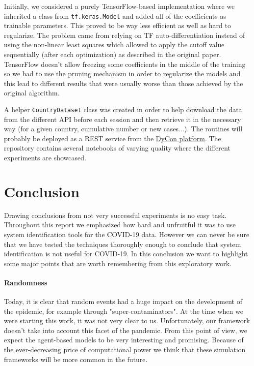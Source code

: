 \documentclass[12pt, letterpaper]{article}
\begin{document}
Initially, we considered a purely TensorFlow-based implementation where we inherited a class from \texttt{tf.keras.Model} and added all of the coefficients as trainable parameters. 
This proved to be way less efficient as well as hard to regularize. 
The problem came from relying on TF auto-differentiation instead of using the non-linear least squares which allowed to apply the cutoff value sequentially (after each optimization) as described in the original paper. 
TensorFlow doesn't allow freezing some coefficients in the middle of the training so we had to use the pruning mechanism in order to regularize the models and this lead to different results that were usually worse than those achieved by the original algorithm.

A helper \texttt{CountryDataset} class was created in order to help download the data from the different API before each session and then retrieve it in the necessary way (for a given country, cumulative number or new cases...). 
The routines will probably be deployed as a REST service from the \href{https://deustotech.github.io/DyCon-Blog/}{DyCon platform}.
The repository contains several notebooks of varying quality where the different experiments are showcased. 


\section{Conclusion}\label{sec:conclusion}

Drawing conclusions from not very successful experiments is no easy task.
Throughout this report we emphasized how hard and unfruitful it was to use system identification tools for the COVID-19 data.
However we can never be sure that we have tested the techniques thoroughly enough to conclude that system identification is not useful for COVID-19.
In this conclusion we want to highlight some major points that are worth remembering from this exploratory work.

\paragraph{Randomness} Today, it is clear that random events had a huge impact on the development of the epidemic, for example through "super-contaminators".
At the time when we were starting this work, it was not very clear to us.
Unfortunately, our framework doesn't take into account this facet of the pandemic.
From this point of view, we expect the agent-based models to be very interesting and promising.
Because of the ever-decreasing price of computational power we think that these simulation frameworks will be more common in the future.
\end{document}
